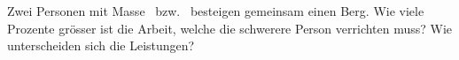 Zwei Personen mit Masse \mpaO\ bzw. \mpbO\ besteigen gemeinsam einen Berg. Wie viele Prozente grösser ist die Arbeit, welche die schwerere Person verrichten muss? Wie unterscheiden sich die Leistungen?
